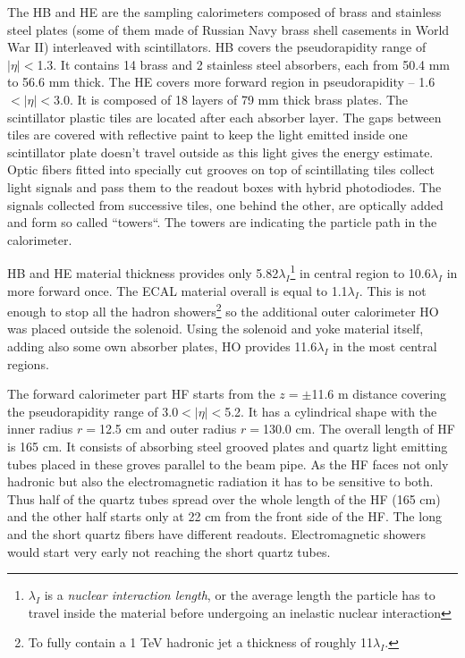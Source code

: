 The HB and HE are the sampling calorimeters composed of brass and stainless steel plates (some of them made of Russian Navy brass 
shell casements in World War II) interleaved with scintillators. HB covers the pseudorapidity range of $|\eta| < $1.3. It contains 14 brass and
2 stainless steel absorbers, each from 50.4 mm to 56.6 mm thick. The HE covers more forward region in pseudorapidity -- 1.6$ < |\eta| < $3.0. It is composed
of 18 layers of 79 mm thick brass plates. The scintillator plastic tiles are located after each absorber layer. The gaps between tiles are covered 
with reflective paint to keep the light emitted inside one scintillator plate doesn't travel outside as this light gives the energy estimate. Optic fibers fitted into
specially cut grooves on top of scintillating tiles collect light signals and pass them to the readout boxes with hybrid photodiodes. The signals
collected from successive tiles, one behind the other, are optically added and form so called ``towers``. The towers are indicating 
the particle path in the calorimeter.

HB and HE material thickness provides only 5.82$\lambda_{I}$\footnote{$\lambda_{I}$ is a \textit{nuclear interaction length}, or the average 
length the particle has to travel inside the material before undergoing an inelastic nuclear interaction} in central region to 10.6$\lambda_{I}$ in more forward once. The 
ECAL material overall is equal to 1.1$\lambda_{I}$. This is not enough to stop all the hadron showers\footnote{To fully contain a 1 TeV hadronic jet a thickness of
roughly 11$\lambda_{I}$.} so the additional outer calorimeter HO
was placed outside the solenoid. Using the solenoid and yoke material itself, adding also some own absorber plates, HO provides 11.6$\lambda_{I}$ in the
most central regions.

The forward calorimeter part HF starts from the $z = \pm$11.6 m distance covering the pseudorapidity range of 3.0$ < |\eta| < $5.2. It has a cylindrical shape
with the inner radius $r = $12.5 cm and outer radius $r = $130.0 cm. The overall length of HF is 165 cm. It consists of absorbing steel grooved plates and
quartz light emitting tubes placed in these groves parallel to the beam pipe. As the HF faces not only hadronic but also the electromagnetic radiation
it has to be sensitive to both. Thus half of the quartz tubes spread over the whole length of the HF (165 cm) and the other half starts only at 22 cm 
from the front side of the HF. The long and the short quartz fibers have different readouts. Electromagnetic showers would start very early  not reaching the 
short quartz tubes.

